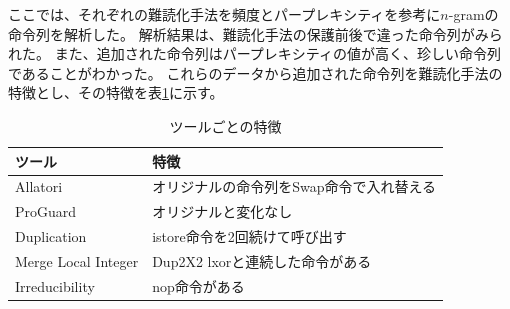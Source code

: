 \documentclass[a4j,fleqn,10pt]{jarticle}
\begin{document}


ここでは、それぞれの難読化手法を頻度とパープレキシティを参考に$n$-gramの命令列を解析した。
解析結果は、難読化手法の保護前後で違った命令列がみられた。
また、追加された命令列はパープレキシティの値が高く、珍しい命令列であることがわかった。
これらのデータから追加された命令列を難読化手法の特徴とし、その特徴を表\ref{table:caractor}に示す。

\begin{table}[t]
  \centering
  \footnotesize{
    \caption{ツールごとの特徴}\label{table:caractor}
  \begin{tabular}{l|l}
    ツール              & 特徴　\\ \hline
    Allatori            & オリジナルの命令列をSwap命令で入れ替える \\
    ProGuard            & オリジナルと変化なし \\
    Duplication         & istore命令を2回続けて呼び出す \\
    Merge Local Integer & Dup2X2 lxorと連続した命令がある \\
    Irreducibility      & nop命令がある \\
  \end{tabular}}
\end{table}
\end{document}
